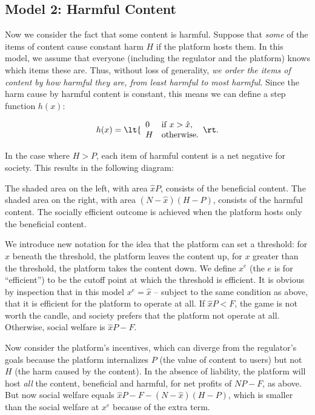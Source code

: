 \subsection{Model 2: Harmful Content}
 
Now we consider the fact that some content is harmful. Suppose that \emph{some} of the items of content cause constant harm $H$ if the platform hosts them. In this model, we assume that everyone (including the regulator and the platform) knows which items these are. Thus, without loss of generality, \emph{we order the items of content by how harmful they are, from least harmful to most harmful}. Since the harm cause by harmful content is constant, this means we can define a step function $h(x)$:

\begin{equation}
h(x)=
\lt\{\begin{array}{ll}
    0 & \mbox{if $x>\hat{x}$}, \\
    H & \mbox{otherwise}.
\end{array}\rt.
\end{equation}

In the case where $H>P$, each item of harmful content is a net negative for society. This results in the following diagram:


The shaded area on the left, with area $\hat{x}P$, consists of the beneficial content. The shaded area on the right, with area $(N - \hat{x})(H-P)$, consists of the harmful content. The socially efficient outcome is achieved when the platform hosts only the beneficial content.

We introduce new notation for the idea that the platform can set a threshold: for $x$ beneath the threshold, the platform leaves the content up, for $x$ greater than the threshold, the platform takes the content down. We define $x^e$ (the $e$ is for ``efficient'') to be the cutoff point at which the threshold is efficient. It is obvious by inspection that in this model $x^e = \hat{x}$ -- subject to the same condition as above, that it is efficient for the platform to operate at all. If $\hat{x}P < F$, the game is not worth the candle, and society prefers that the platform not operate at all. Otherwise, social welfare is $\hat{x}P - F$.

Now consider the platform's incentives, which can diverge from the regulator's goals because the platform internalizes $P$ (the value of content to users) but not $H$ (the harm caused by the content).  In the absence of liability, the platform will host \emph{all} the content, beneficial and harmful, for net profits of $NP - F$, as above. But now social welfare equals $\hat{x}P - F - (N - \hat{x})(H - P)$, which is smaller than the social welfare at $x^e$ because of the extra term.

